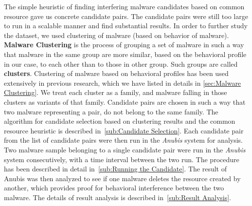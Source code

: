 The simple heuristic of finding interfering malware candidates based on common resource gave us concrete candidate pairs.  The candidate pairs were still too large to run in a scalable manner and find substantial results.
In order to further study the dataset, we used clustering of malware (based on behavior of malware).
\textbf{Malware Clustering} is the process of grouping a set of malware in such a way that malware in the same group are more similar, based on the behavioral profile in our case, to each other than to those in other group.
Such groups are called \textbf{clusters}.
Clustering of malware based on behavioral profiles has been used extensively in previous research, which we have listed in details in \autoref{sec:Malware Clustering}.
We treat each cluster as a family, and malware falling in those clusters as variants of that family.
Candidate pairs are chosen in such a way that two malware representing a pair, do not belong to the same family.
The algorithm for candidate selection based on clustering results and the common resource heuristic is described in~\autoref{sub:Candidate Selection}.
Each candidate pair from the list of candidate pairs were then run in the \emph{Anubis} system for analysis.\\
Two malware sample belonging to a single candidate pair were run in the \emph{Anubis} system consecutively, with a time interval between the two run.
The procedure has been described in detail in~\autoref{sub:Running the Candidate}.
The result of Anubis was then analyzed to see if one malware deletes the resource created by another, which provides proof for behavioral interference between the two malware.
The details of result analysis is described in~\autoref{sub:Result Analysis}.\\
